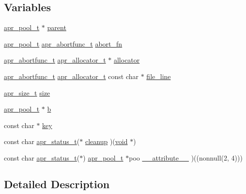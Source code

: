 \subsection*{Variables}
\begin{DoxyCompactItemize}
\item 
\hyperlink{structapr__pool__t}{apr\+\_\+pool\+\_\+t} $\ast$ \hyperlink{group__apr__pools_ga3eb8c52002440da9a3eed11d54d08dd5}{parent}
\item 
\hyperlink{structapr__pool__t}{apr\+\_\+pool\+\_\+t} \hyperlink{group__apr__pools_ga370a939349adf6d1438068e2fc69a0dd}{apr\+\_\+abortfunc\+\_\+t} \hyperlink{group__apr__pools_gaf5a8821081b4fed18bef302377c796e4}{abort\+\_\+fn}
\item 
\hyperlink{group__apr__pools_ga370a939349adf6d1438068e2fc69a0dd}{apr\+\_\+abortfunc\+\_\+t} \hyperlink{structapr__allocator__t}{apr\+\_\+allocator\+\_\+t} $\ast$ \hyperlink{group__apr__pools_ga3d4c7b6ba19a3b46b6fecdee3d867787}{allocator}
\item 
\hyperlink{group__apr__pools_ga370a939349adf6d1438068e2fc69a0dd}{apr\+\_\+abortfunc\+\_\+t} \hyperlink{structapr__allocator__t}{apr\+\_\+allocator\+\_\+t} const char $\ast$ \hyperlink{group__apr__pools_ga6ff83cbf1d5de0befaa318c392539164}{file\+\_\+line}
\item 
\hyperlink{group__apr__platform_gaaa72b2253f6f3032cefea5712a27540e}{apr\+\_\+size\+\_\+t} \hyperlink{group__apr__pools_ga5f598d678d0ca77c25732a145c68d3c7}{size}
\item 
\hyperlink{structapr__pool__t}{apr\+\_\+pool\+\_\+t} $\ast$ \hyperlink{group__apr__pools_ga2e9e9d1380aacd6ec8b616ae04374821}{b}
\item 
const char $\ast$ \hyperlink{group__apr__pools_gacd3d88da3c0e0313c3645ff34f62f542}{key}
\item 
const char \hyperlink{group__apr__errno_gaa5105fa83cc322f09382292db8b47593}{apr\+\_\+status\+\_\+t}($\ast$ \hyperlink{group__apr__pools_ga36572a384d49086c60d5aeec6fea04fc}{cleanup} )(\hyperlink{group__MOD__ISAPI_gacd6cdbf73df3d9eed42fa493d9b621a6}{void} $\ast$)
\item 
const char \hyperlink{group__apr__errno_gaa5105fa83cc322f09382292db8b47593}{apr\+\_\+status\+\_\+t}($\ast$) \hyperlink{structapr__pool__t}{apr\+\_\+pool\+\_\+t} $\ast$poo \hyperlink{group__apr__pools_ga4ac3dbc221e1d805779ab73b97a3566e}{\+\_\+\+\_\+attribute\+\_\+\+\_\+} )((nonnull(2, 4)))
\end{DoxyCompactItemize}


\subsection{Detailed Description}



